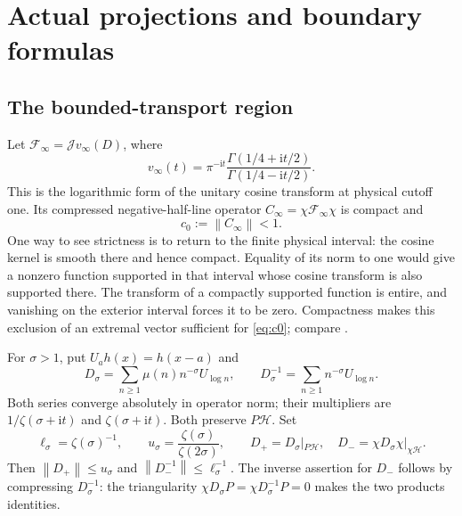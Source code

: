 \documentclass[11pt]{article}
\numberwithin{equation}{section}
\theoremstyle{definition}
\theoremstyle{remark}
\newcommand{\HH}{\mathcal H}
\newcommand{\ii}{\mathrm i}
\newcommand{\J}{\mathcal J}
\newcommand{\Fcal}{\mathcal F}
\newcommand{\norm}[1]{\left\lVert #1\right\rVert}
\begin{document}
\section{Actual projections and boundary formulas}\label{sec:boundary}

\subsection{The bounded-transport region}

Let \(\Fcal_\infty=\J v_\infty(D)\), where
\[
v_\infty(t)=
\pi^{-\ii t}\frac{\Gamma(1/4+\ii t/2)}
{\Gamma(1/4-\ii t/2)}.
\]
This is the logarithmic form of the unitary cosine transform at physical
cutoff one. Its compressed negative-half-line operator
\(C_\infty=\chi\Fcal_\infty\chi\) is compact and
\begin{equation}\label{eq:c0}
c_0:=\norm{C_\infty}<1.
\end{equation}
One way to see strictness is to return to the finite physical interval:
the cosine kernel is smooth there and hence compact. Equality of its
norm to one would give a nonzero function supported in that interval
whose cosine transform is also supported there. The transform of a
compactly supported function is entire, and vanishing on the exterior
interval forces it to be zero. Compactness makes this exclusion of an
extremal vector sufficient for \eqref{eq:c0}; compare \cite{CCWeil}.

For \(\sigma>1\), put \(U_ah(x)=h(x-a)\) and
\begin{equation}\label{eq:transport}
D_\sigma=\sum_{n\ge1}\mu(n)n^{-\sigma}U_{\log n},
\qquad
D_\sigma^{-1}=\sum_{n\ge1}n^{-\sigma}U_{\log n}.
\end{equation}
Both series converge absolutely in operator norm; their multipliers
are \(1/\zeta(\sigma+\ii t)\) and \(\zeta(\sigma+\ii t)\).
Both preserve \(P\HH\). Set
\[
\ell_\sigma=\zeta(\sigma)^{-1},\qquad
u_\sigma=\frac{\zeta(\sigma)}{\zeta(2\sigma)},\qquad
D_+=D_\sigma|_{P\HH},\quad
D_-=\chi D_\sigma\chi|_{\chi\HH}.
\]
Then \(\norm{D_+}\le u_\sigma\) and
\(\norm{D_-^{-1}}\le\ell_\sigma^{-1}\).
The inverse assertion for \(D_-\) follows by compressing
\(D_\sigma^{-1}\): the triangularity
\(\chi D_\sigma P=\chi D_\sigma^{-1}P=0\) makes the two products identities.
\end{document}
